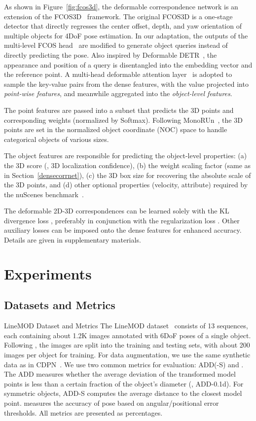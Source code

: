 \documentclass[10pt,twocolumn,letterpaper]{article}
\makeatletter
\renewcommand{\paragraph}{
  \@startsection{paragraph}{4}
  {\z@}{1.0ex \@plus 0ex \@minus .3ex}{-1em}
  {\normalfont\normalsize\bfseries}
}
\makeatother
\begin{document}
As shown in Figure~\ref{fig:fcos3d}, the deformable correspondence network is an extension of the FCOS3D~\cite{fcos3d} framework. The original FCOS3D is a one-stage detector that directly regresses the center offset, depth, and yaw orientation of multiple objects for 4DoF pose estimation. In our adaptation, the outputs of the multi-level FCOS head~\cite{fcos} are modified to generate object queries instead of directly predicting the pose. Also inspired by Deformable DETR~\cite{deformabledetr}, the appearance and position of a query is disentangled into the embedding vector and the reference point. A multi-head deformable attention layer~\cite{deformabledetr} is adopted to sample the key-value pairs from the dense features, with the value projected into \emph{point-wise features}, and meanwhile aggregated into the \emph{object-level features}. 

The point features are passed into a subnet that predicts the 3D points and corresponding weights (normalized by Softmax). Following MonoRUn~\cite{monorun}, the 3D points are set in the normalized object coordinate (NOC) space to handle categorical objects of various sizes.

The object features are 
responsible for predicting the object-level properties: (a) the 3D score (\ie, 3D localization confidence), (b) the weight scaling factor (same as in Section~\ref{densecorrnet}), (c) the 3D box size for recovering the absolute scale of the 3D points, and (d) other optional properties (velocity, attribute) required by the nuScenes benchmark~\cite{nuscenes}.

The deformable 2D-3D correspondences can be learned solely with the KL divergence loss ,
preferably in conjunction with the regularization loss . Other auxiliary losses can be imposed onto the dense features for enhanced accuracy. Details are given in supplementary materials.

\section{Experiments}
\subsection{Datasets and Metrics}
\paragraph{LineMOD Dataset and Metrics}
The LineMOD dataset~\cite{linemod} consists of 13 sequences, each containing about 1.2K images annotated with 6DoF poses of a single object. Following \cite{Brachmann_2016_CVPR}, the images are split into the training and testing sets, with about 200 images per object for training. For data augmentation, we use the same synthetic data as in CDPN~\cite{CDPN}.
We use two common metrics for evaluation: ADD(-S) and . The ADD measures whether the average deviation of the transformed model points is less than a certain fraction of the object’s diameter (\eg, ADD-0.1d). For symmetric objects, ADD-S computes the average distance to the closest model point.  measures the accuracy of pose based on angular/positional error thresholds. All metrics are presented as percentages.
\end{document}
